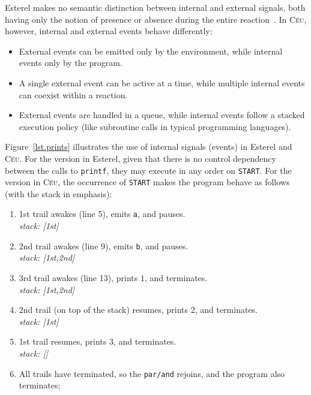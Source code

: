 \documentclass{acm_proc_article-sp}
\newcommand{\CEU}{\textsc{C\'{e}u}\xspace}
\newcommand{\code}[1] {{\small{\texttt{#1}}}}
\newcommand{\1}{\;}
\newcommand{\2}{\;\;}
\newcommand{\3}{\;\;\;}
\newcommand{\5}{\;\;\;\;\;}
\begin{document}
Esterel makes no semantic distinction between internal and external signals, 
both having only the notion of presence or absence during the entire 
reaction~\cite{esterel.preemption}.
%
In \CEU, however, internal and external events behave differently:

\begin{itemize}
\item External events can be emitted only by the environment, while internal 
events only by the program.
\item A single external event can be active at a time, while multiple internal 
events can coexist within a reaction.
\item External events are handled in a queue, while internal events follow a 
stacked execution policy (like subroutine calls in typical programming 
languages).
\end{itemize}

Figure~\ref{lst.prints} illustrates the use of internal signals (events) in 
Esterel and \CEU.
%
For the version in Esterel, given that there is no control dependency between 
the calls to \code{printf}, they may execute in any order on \code{START}.
%
For the version in \CEU, the occurrence of \code{START} makes the program 
behave as follows (with the stack in emphasis):
%
{\small
\begin{enumerate}
\setlength{\itemsep}{0pt}
\item 1st trail awakes (line 5), emits \code{a}, and pauses.\\
    \emph{stack: [1st]}
\item 2nd trail awakes (line 9), emits \code{b}, and pauses.\\
    \emph{stack: [1st,2nd]}
\item 3rd trail awakes (line 13), prints $1$, and terminates.\\
    \emph{stack: [1st,2nd]}
\item 2nd trail (on top of the stack) resumes, prints $2$, and terminates.\\
    \emph{stack: [1st]}
\item 1st trail resumes, prints $3$, and terminates.\\
    \emph{stack: []}
\item All trails have terminated, so the \code{par/and} rejoins, and the 
program also terminates;
\end{enumerate}
}
\end{document}
